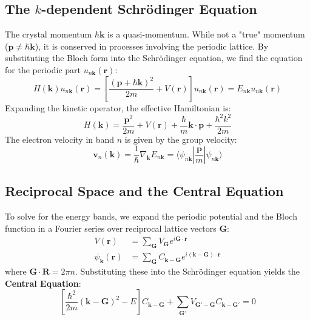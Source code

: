 \documentclass[10pt, a4paper]{article}
\begin{document}
\subsection{The $k$-dependent Schrödinger Equation}
The crystal momentum $\hbar \mathbf{k}$ is a quasi-momentum. While not a "true" momentum ($\mathbf{p} \neq \hbar\mathbf{k}$), it is conserved in processes involving the periodic lattice.
By substituting the Bloch form into the Schrödinger equation, we find the equation for the periodic part $u_{n\mathbf{k}}(\mathbf{r})$:
\begin{equation}
    H(\mathbf{k}) u_{n\mathbf{k}}(\mathbf{r}) = \left[ \frac{(\mathbf{p} + \hbar\mathbf{k})^2}{2m} + V(\mathbf{r}) \right] u_{n\mathbf{k}}(\mathbf{r}) = E_{n\mathbf{k}} u_{n\mathbf{k}}(\mathbf{r})
\end{equation}
Expanding the kinetic operator, the effective Hamiltonian is:
\begin{equation}
    H(\mathbf{k}) = \frac{\mathbf{p}^2}{2m} + V(\mathbf{r}) + \frac{\hbar}{m}\mathbf{k}\cdot\mathbf{p} + \frac{\hbar^2k^2}{2m}
\end{equation}
The electron velocity in band $n$ is given by the group velocity:
\begin{equation}
    \mathbf{v}_n(\mathbf{k}) = \frac{1}{\hbar} \nabla_{\mathbf{k}} E_{n\mathbf{k}} = \langle \psi_{n\mathbf{k}} | \frac{\mathbf{p}}{m} | \psi_{n\mathbf{k}} \rangle
\end{equation}

\subsection{Reciprocal Space and the Central Equation}
To solve for the energy bands, we expand the periodic potential and the Bloch function in a Fourier series over reciprocal lattice vectors $\mathbf{G}$:
\begin{align}
    V(\mathbf{r}) &= \sum_{\mathbf{G}} V_{\mathbf{G}} e^{i\mathbf{G} \cdot \mathbf{r}} \\
    \psi_{\mathbf{k}}(\mathbf{r}) &= \sum_{\mathbf{G}} C_{\mathbf{k}-\mathbf{G}} e^{i(\mathbf{k}-\mathbf{G}) \cdot \mathbf{r}}
\end{align}
where $\mathbf{G} \cdot \mathbf{R} = 2\pi n$. Substituting these into the Schrödinger equation yields the \textbf{Central Equation}:
\begin{equation}
    \left[ \frac{\hbar^2}{2m}(\mathbf{k}-\mathbf{G})^2 - E \right] C_{\mathbf{k}-\mathbf{G}} + \sum_{\mathbf{G}'} V_{\mathbf{G}'-\mathbf{G}} C_{\mathbf{k}-\mathbf{G}'} = 0
\end{equation}
\end{document}

